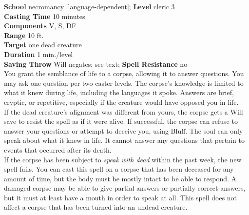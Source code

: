 \textbf{School} necromancy [language-dependent]; \textbf{Level} cleric 3\\
\textbf{Casting Time} 10 minutes\\
\textbf{Components} V, S, DF\\
\textbf{Range} 10 ft.\\
\textbf{Target} one dead creature\\
\textbf{Duration} 1 min./level\\
\textbf{Saving Throw }Will negates; see text; \textbf{Spell Resistance} no\\
You grant the semblance of life to a corpse, allowing it to answer questions. You may ask one question per two caster levels. The corpse's knowledge is limited to what it knew during life, including the languages it spoke. Answers are brief, cryptic, or repetitive, especially if the creature would have opposed you in life.\\
If the dead creature's alignment was different from yours, the corpse gets a Will save to resist the spell as if it were alive. If successful, the corpse can refuse to answer your questions or attempt to deceive you, using Bluff. The soul can only speak about what it knew in life. It cannot answer any questions that pertain to events that occurred after its death.\\
If the corpse has been subject to \textit{speak with dead }within the past week, the new spell fails. You can cast this spell on a corpse that has been deceased for any amount of time, but the body must be mostly intact to be able to respond. A damaged corpse may be able to give partial answers or partially correct answers, but it must at least have a mouth in order to speak at all. This spell does not affect a corpse that has been turned into an undead creature.\\
